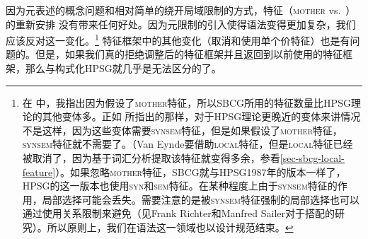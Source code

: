 因为元表述的概念问题和相对简单的绕开局域限制的方式，特征（\textsc{mother} vs.\ \synsemc）的重新安排 没有带来任何好处。因为元限制的引入使得语法变得更加复杂，我们应该反对这一变化。\footnote{%
  在 中，我指出因为假设了\textsc{mother}特征，所以SBCG所用的特征数量比HPSG理论的其他变体多。正如 \citet{VanEynde2015a}所指出的那样，对于HPSG理论更晚近的变体来讲情况不是这样，因为这些变体需要\textsc{synsem}特征，但是如果假设了\textsc{mother}特征，\textsc{synsem}特征就不需要了。（Van Eynde要借助\textsc{local}特征，但是\textsc{local}特征已经被取消了，因为基于词汇分析提取该特征就变得多余，参看\ref{sec-sbcg-local-feature}）。如果忽略\textsc{mother}特征，SBCG就与HPSG1987年的版本\citep{ps}一样了，HPSG的这一版本也使用\textsc{syn}和\textsc{sem}特征。在某种程度上由于\textsc{synsem}特征的作用，局部选择可能会丢失\citep[]{Sag2012a}。需要注意的是被\textsc{synsem}特征强制的局部选择也可以通过使用关系限制来避免（见Frank Richter和Manfred Sailer对于搭配的研究\citep{RS99b-u,SS2003a}）。所以原则上，我们在语法这一领域也以设计规范结束。%
} 特征框架中的其他变化（取消\localfc 和使用单个价特征）也是有问题的。但是，如果我们真的拒绝调整后的特征框架并且返回到以前使用的特征框架，那么\sbcgc 与构式化HPSG\citep{Sag97a}就几乎是无法区分的了。

